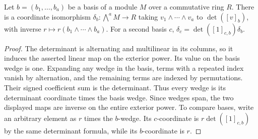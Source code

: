 \begin{lemma}
\label{lem:determinant-coordinates}
\leanok
Let $b=(b_1,\ldots,b_a)$ be a basis of a module $M$ over a commutative
ring $R$. There is a coordinate isomorphism
$\delta_b:\bigwedge^aM\to R$ taking $v_1\wedge\cdots\wedge v_a$ to
$\det([v]_b)$, with inverse $r\mapsto r(b_1\wedge\cdots\wedge b_a)$.
For a second basis $c$,
$\delta_c=\det([1]_{c,b})\delta_b$.
\end{lemma}
\begin{proof}
The determinant is alternating and multilinear in its columns, so it
induces the asserted linear map on the exterior power. Its value on the
basis wedge is one. Expanding any wedge in the basis, terms with a
repeated index vanish by alternation, and the remaining terms are indexed
by permutations. Their signed coefficient sum is the determinant.
Thus every wedge is its determinant coordinate times the basis wedge.
Since wedges span, the two displayed maps are inverse on the entire
exterior power. To compare bases, write an arbitrary element as $r$
times the $b$-wedge. Its $c$-coordinate is $r\det([1]_{c,b})$ by the
same determinant formula, while its $b$-coordinate is $r$.
\end{proof}


